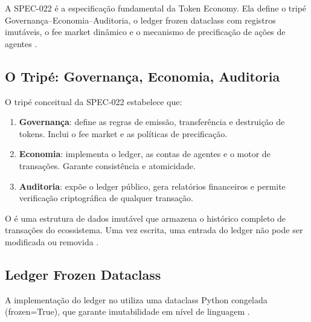 A SPEC-022 é a especificação fundamental da Token Economy.
Ela define o tripé Governança--Economia--Auditoria, o ledger
frozen dataclass com registros imutáveis, o fee market dinâmico
e o mecanismo de precificação de ações de agentes
\cite{opencode2026token}.

\subsection{O Tripé: Governança, Economia, Auditoria}

O tripé conceitual da SPEC-022 estabelece que:

\begin{enumerate}
\item \textbf{Governança}: define as regras de emissão,
transferência e destruição de tokens. Inclui o fee market e as
políticas de precificação.
\item \textbf{Economia}: implementa o ledger, as contas de
agentes e o motor de transações. Garante consistência e
atomicidade.
\item \textbf{Auditoria}: expõe o ledger público, gera relatórios
financeiros e permite verificação criptográfica de qualquer
transação.
\end{enumerate}

\begin{definicao}
O  é uma estrutura de dados imutável que
armazena o histórico completo de transações do ecossistema. Uma
vez escrita, uma entrada do ledger não pode ser modificada ou
removida \cite{opencode2026token, nakamoto2008bitcoin}.
\end{definicao}

\subsection{Ledger Frozen Dataclass}

A implementação do ledger no \opencodeeco{} utiliza uma dataclass
Python congelada (frozen=True), que garante imutabilidade em nível
de linguagem \cite{opencode2026token}.

